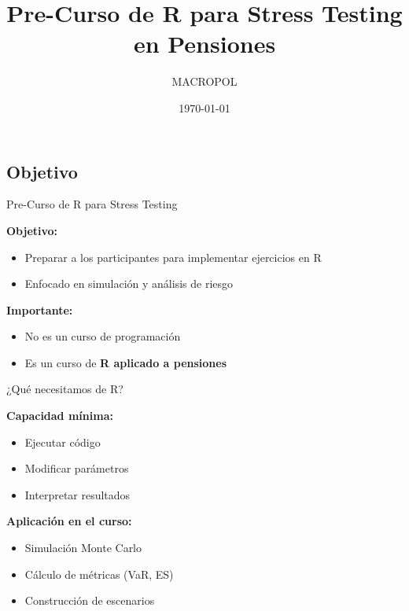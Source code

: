 \documentclass[10pt]{beamer}
\title{Pre-Curso de R para Stress Testing en Pensiones}
\author{MACROPOL}
\date{\today}
\begin{document}
\begin{frame}
\titlepage
\end{frame}


\subsection{Objetivo}

\begin{frame}{Pre-Curso de R para Stress Testing}

\textbf{Objetivo:}
\begin{itemize}
\item Preparar a los participantes para implementar ejercicios en R
\item Enfocado en simulación y análisis de riesgo
\end{itemize}

\vspace{0.5cm}

\textbf{Importante:}
\begin{itemize}
\item No es un curso de programación
\item Es un curso de \textbf{R aplicado a pensiones}
\end{itemize}

\end{frame}

\begin{frame}{¿Qué necesitamos de R?}

\textbf{Capacidad mínima:}

\begin{itemize}
\item Ejecutar código
\item Modificar parámetros
\item Interpretar resultados
\end{itemize}

\vspace{0.5cm}

\textbf{Aplicación en el curso:}
\begin{itemize}
\item Simulación Monte Carlo
\item Cálculo de métricas (VaR, ES)
\item Construcción de escenarios
\end{itemize}

\end{frame}
\end{document}
